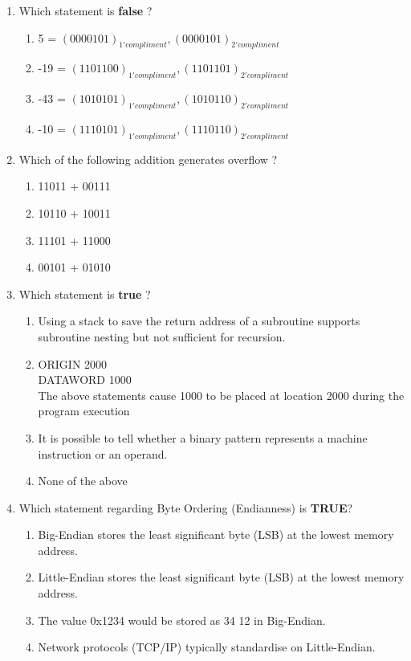 \documentclass[a4paper,12pt]{article}
\begin{document}
\begin{enumerate}[label=\textbf{\arabic*.}]
    \item Which statement is \textbf{false} ?
    \begin{enumerate}[label=\alph*)]
        \item 5 \hspace{0.5cm} = $(0000101)_{1'compliment}, (0000101)_{2'compliment}$
        \item -19 \hspace{0.2cm} = $(1101100)_{1'compliment}, (1101101)_{2'compliment}$
        \item -43 \hspace{0.2cm} = $(1010101)_{1'compliment}, (1010110)_{2'compliment}$
        \item -10 \hspace{0.2cm} = $(1110101)_{1'compliment}, (1110110)_{2'compliment}$
    \end{enumerate}

    \item Which of the following addition generates overflow ?
    \begin{enumerate}[label=\alph*)]
        \item 11011 + 00111
        \item 10110 + 10011
        \item 11101 + 11000
        \item 00101 + 01010
    \end{enumerate}

    \item Which statement is \textbf{true} ?
    \begin{enumerate}[label=\alph*)]
        \item Using a stack to save the return address of a subroutine supports subroutine nesting but not sufficient for recursion.
        \item ORIGIN 2000 \\ DATAWORD 1000 \\ The above statements cause 1000 to be placed at location 2000 during the program execution
        \item It is possible to tell whether a binary pattern represents a machine instruction or an operand.
        \item None of the above
    \end{enumerate}

    \item Which statement regarding Byte Ordering (Endianness) is \textbf{TRUE}?
    \begin{enumerate}[label=\alph*)]
        \item Big-Endian stores the least significant byte (LSB) at the lowest memory address.
        \item Little-Endian stores the least significant byte (LSB) at the lowest memory address.
        \item The value 0x1234 would be stored as 34 12 in Big-Endian.
        \item Network protocols (TCP/IP) typically standardise on Little-Endian.
    \end{enumerate}


\end{enumerate}
\end{document}
